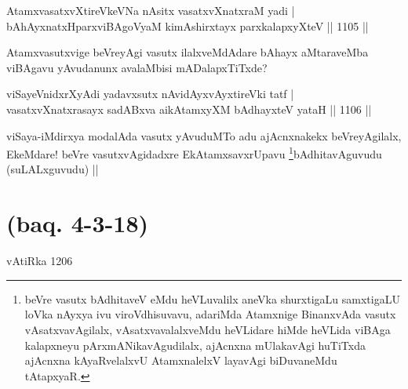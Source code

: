 \begin{shl}
AtamxvasatxvXtireVkeVNa nAsitx vasatxvXnatxraM yadi | \\
bAhAyxnatxHparxviBAgoV\s yaM kimAshirxtayx parxkalapxyXteV \hfill||  1105 ||  
\end{shl}

\begin{artha}
Atamxvasutxvige beVreyAgi vasutx ilalxveMdAdare bAhayx aMtaraveMba viBAgavu yAvudanunx avalaMbisi mADalapxTiTxde?
\end{artha}


\begin{shl}
viSayeVnidxrXyAdi yadavxsutx nAvidAyxvAyxtireVki tatf | \\
vasatxvXnatxrasayx sadABxva aikAtamxyXM bAdhayxteV yataH \hfill||  1106 ||  
\end{shl}

\begin{artha}
viSaya-iMdirxya modalAda vasutx yAvuduMTo adu ajAcnxnakekx beVreyAgilalx, EkeMdare! beVre vasutxvAgidadxre EkAtamxsavxrUpavu \footnote{beVre vasutx bAdhitaveV eMdu heVLuvalilx aneVka shurxtigaLu samxtigaLU loVka nAyxya ivu viroVdhisuvavu, adariMda Atamxnige BinanxvAda vasutx vAsatxvavAgilalx, vAsatxvavalalxveMdu heVLidare hiMde heVLida viBAga kalapxneyu pArxmANikavAgudilalx, ajAcnxna mUlakavAgi huTiTxda ajAcnxna kAyaRvelalxvU AtamxnalelxV layavAgi biDuvaneMdu tAtapxyaR.}bAdhitavAguvudu (suLALxguvudu) ||
\end{artha}

\section*{(baq. 4-3-18)} vAtiRka 1206

